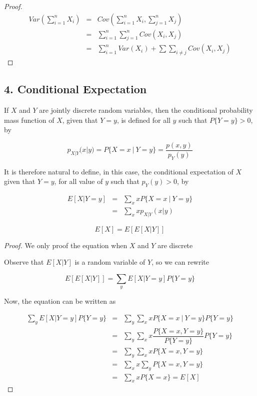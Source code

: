 \begin{proof}
	\begin{eqnarray*}
		Var\left(\sum^n_{i = 1}X_i\right) &=& Cov\left(\sum^n_{i = 1}X_i,\sum^n_{j = 1}X_j\right) \\
		&=& \sum^{n}_{i = 1}\sum^{n}_{j = 1}Cov(X_i,X_j)\\
		&=& \sum^n_{i = 1}Var(X_i) + \sum\sum_{i \neq j}Cov(X_i,X_j)
	\end{eqnarray*}
\end{proof}


\newpage

\subsection*{4. Conditional Expectation}

\begin{defn}
	If $X$ and $Y$ are jointly discrete random variables, then the conditional probability mass function of $X$, given that $Y = y$, is defined for all $y$ such that $P\{Y = y \} > 0$, by
	
	$$p_{X|Y}(x|y) = P\{X = x ~|~ Y = y\} = \dfrac{p(x,y)}{p_Y(y)}$$
	
	It is therefore natural to define, in this case, the conditional expectation of $X$ given that $Y = y$, for all value of $y$ such that $p_Y(y) > 0$, by
	
	\begin{eqnarray*}
		E[X|Y =  y] &=& \sum_x xP\{X = x~|~ Y = y\}\\
		&=& \sum_x xp_{X|Y}(x|y)
	\end{eqnarray*}
\end{defn}

\begin{prop*}
	$$E[X] = E[E[X|Y]]$$
\end{prop*}

\begin{proof}
	We only proof the equation when $X$ and $Y$ are discrete
	
	Observe that $E[X|Y]$ is a random variable of $Y$, so we can rewrite
	
	$$E[E[X|Y]] = \sum_yE[X|Y = y]P\{Y = y\}$$
	
	Now, the equation can be written as
	
	\begin{eqnarray*}
		\sum_yE[X|Y = y]P\{Y = y\} &=& \sum_y\sum_xxP\{X = x ~|~ Y = y\}P\{Y = y\}\\
		&=& \sum_y\sum_xx\dfrac{P\{X = x,Y = y\}}{P\{Y = y\}}P\{Y = y\}\\
		&=& \sum_y\sum_xxP\{X = x,Y = y\}\\
		&=& \sum_x x \sum_y P\{X = x,Y = y\}\\
		&=& \sum_x xP\{ X = x\} = E[X]
	\end{eqnarray*}
\end{proof}

